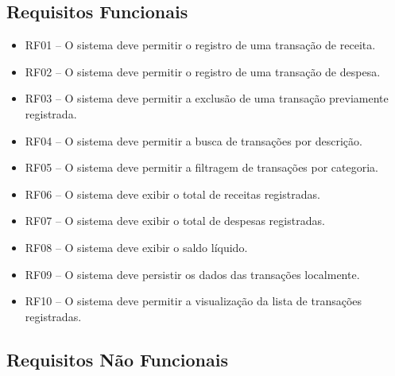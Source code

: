 \documentclass[12pt,a4paper]{article}
\begin{document}
\subsection{Requisitos Funcionais}

\begin{itemize}
    \item RF01 -- O sistema deve permitir o registro de uma transação de receita.
    \item RF02 -- O sistema deve permitir o registro de uma transação de despesa.
    \item RF03 -- O sistema deve permitir a exclusão de uma transação previamente registrada.
    \item RF04 -- O sistema deve permitir a busca de transações por descrição.
    \item RF05 -- O sistema deve permitir a filtragem de transações por categoria.
    \item RF06 -- O sistema deve exibir o total de receitas registradas.
    \item RF07 -- O sistema deve exibir o total de despesas registradas.
    \item RF08 -- O sistema deve exibir o saldo líquido.
    \item RF09 -- O sistema deve persistir os dados das transações localmente.
    \item RF10 -- O sistema deve permitir a visualização da lista de transações registradas.
\end{itemize}

\subsection{Requisitos Não Funcionais}
\end{document}
